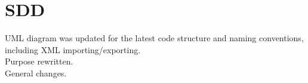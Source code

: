 \documentclass[12pt,a4paper]{article}
\begin{document}
	
	\section{SDD}
    UML diagram was updated for the latest code structure and naming conventions, including XML importing/exporting.\\
    Purpose rewritten.\\
    General changes.\\
    
    
    
    
    
    
    
    
    
    
    
    
    
\end{document}
